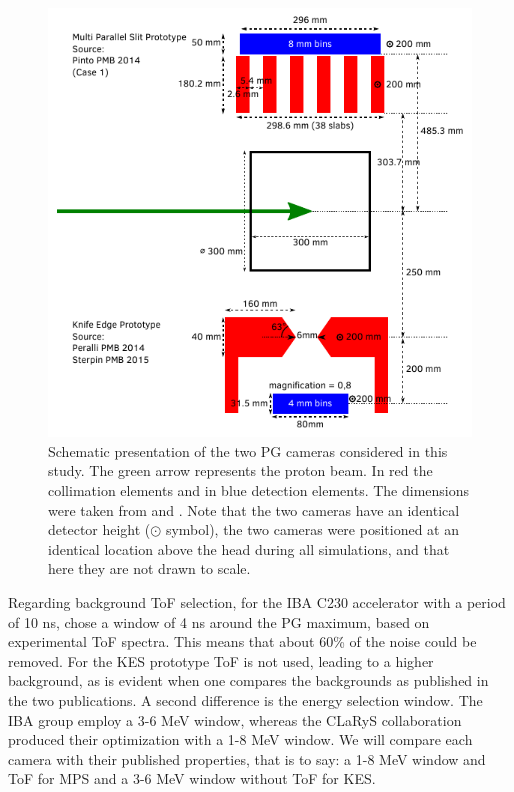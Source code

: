 \documentclass[a4paper,english]{article}
\begin{document}
\begin{figure}[htp]
  \centering
  \includegraphics[width=0.9\linewidth]{detectors_cyl}
  \caption{Schematic presentation of the two PG cameras considered in this study. The green arrow represents the proton beam. In red the collimation elements and in blue detection elements. The dimensions were taken from \cite{Pinto2014a} and \cite{Perali2014,Sterpin2015}. Note that the two cameras have an identical detector height ($\odot$ symbol), the two cameras were positioned at an identical location above the head during all simulations, and that here they are not drawn to scale.}
  \label{fig:detectors}
\end{figure}

Regarding background ToF selection, for the IBA C230 accelerator with a period of 10 ns, \cite{Pinto2014a} chose a window of 4 ns around the PG maximum, based on experimental ToF spectra. This means that about 60\% of the noise could be removed. For the KES prototype ToF is not used, leading to a higher background, as is evident when one compares the backgrounds as published in the two publications. A second difference is the energy selection window. The IBA group employ a 3-6 MeV window, whereas the CLaRyS collaboration produced their optimization with a 1-8 MeV window. We will compare each camera with their published properties, that is to say: a 1-8 MeV window and ToF for MPS and a 3-6 MeV window without ToF for KES.
\end{document}
